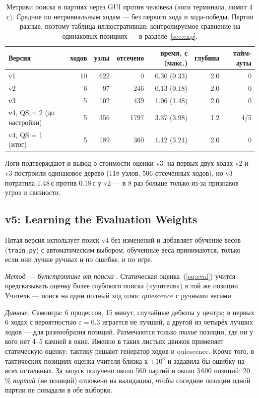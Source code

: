 \documentclass[a4paper,10pt,twocolumn]{article}
\newcommand{\code}[1]{\texttt{#1}}
\begin{document}
\begin{table}[t]
\centering
\caption{Метрики поиска в партиях через GUI против человека (логи терминала, лимит 4\,с). Средние по нетривиальным ходам --- без первого хода и хода-победы. Партии разные, поэтому таблица иллюстративная; контролируемое сравнение на одинаковых позициях --- в разделе~\ref{sec:exp}.}
\label{tab:gui}
\begin{tabular}{@{}lrrrrrr@{}}
\toprule
Версия & ходов & узлы & отсечено & время, с (макс.) & глубина & тайм-ауты \\
\midrule
v1 & 10 & 622 & 0 & 0.30 (0.33) & 2.0 & 0 \\
v2 & 6 & 97 & 246 & 0.13 (0.18) & 2.0 & 0 \\
v3 & 5 & 102 & 439 & 1.06 (1.48) & 2.0 & 0 \\
v4, QS = 2 (до настройки) & 5 & 356 & 1797 & 3.37 (3.98) & 1.2 & 4/5 \\
v4, QS = 1 (итог) & 5 & 189 & 360 & 1.12 (3.24) & 2.0 & 0 \\
\bottomrule
\end{tabular}
\end{table}

Логи подтверждают и вывод о стоимости оценки v3: на первых двух ходах v2 и v3 построили одинаковое дерево (118 узлов, 506 отсечённых ходов), но v3 потратила 1.48\,с против 0.18\,с у v2 --- в 8 раз больше только из-за признаков угроз и связности.

\subsection{v5: Learning the Evaluation Weights}\label{sec:v5}
Пятая версия использует поиск v4 без изменений и добавляет обучение весов (\code{train.py}) с автоматическим выбором: обученные веса принимаются, только если они лучше ручных и по ошибке, и по игре.

\emph{Метод --- бутстрэппинг от поиска} \citep{veness2009bootstrapping,texel}. Статическая оценка~(\ref{eq:eval}) учится предсказывать оценку более глубокого поиска («учителя») в той же позиции. Учитель --- поиск на один полный ход плюс quiescence с ручными весами.

\emph{Данные.} Самоигра: 6 процессов, 15 минут, случайные дебюты у центра; в первых 6 ходах с вероятностью $\varepsilon=0.3$ играется не лучший, а другой из четырёх лучших ходов --- для разнообразия позиций. Размечаются только \emph{тихие} позиции, где ни у кого нет 4--5 камней в окне. Именно в таких листьях движок применяет статическую оценку: тактику решают генератор ходов и quiescence. Кроме того, в тактических позициях оценка учителя близка к $\pm10^6$ и задавила бы ошибку на всех остальных. За запуск получено около 560 партий и около 3\,600 позиций; 20\,\% \emph{партий} (не позиций) отложено на валидацию, чтобы соседние позиции одной партии не попадали в обе выборки.
\end{document}
